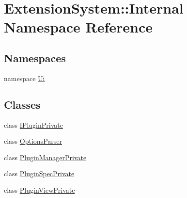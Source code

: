 \hypertarget{namespace_extension_system_1_1_internal}{\section{Extension\-System\-:\-:Internal Namespace Reference}
\label{namespace_extension_system_1_1_internal}
}
\subsection*{Namespaces}
\begin{DoxyCompactItemize}
\item 
namespace \hyperlink{namespace_extension_system_1_1_internal_1_1_ui}{Ui}
\end{DoxyCompactItemize}
\subsection*{Classes}
\begin{DoxyCompactItemize}
\item 
class \hyperlink{class_extension_system_1_1_internal_1_1_i_plugin_private}{I\-Plugin\-Private}
\item 
class \hyperlink{class_extension_system_1_1_internal_1_1_options_parser}{Options\-Parser}
\item 
class \hyperlink{class_extension_system_1_1_internal_1_1_plugin_manager_private}{Plugin\-Manager\-Private}
\item 
class \hyperlink{class_extension_system_1_1_internal_1_1_plugin_spec_private}{Plugin\-Spec\-Private}
\item 
class \hyperlink{class_extension_system_1_1_internal_1_1_plugin_view_private}{Plugin\-View\-Private}
\end{DoxyCompactItemize}

